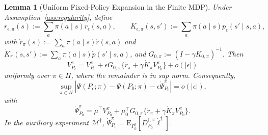 \documentclass[10pt,a4paper]{amsart}
\newtheorem{lemma}{Lemma}
\newcommand{\E}{\mathrm{E}}
\begin{document}
\begin{lemma}[Uniform Fixed-Policy Expansion in the Finite MDP]
\label{lem:finite_mdp_uniform_expansion}
    Under Assumption~\ref{ass:regularity}, define
    \[
        r_{\epsilon,\pi}(s)
        :=\sum_a\pi(a\mid s)r_\epsilon(s,a),
        \qquad
        K_{\epsilon,\pi}(s,s')
        :=\sum_a\pi(a\mid s)p_\epsilon(s'\mid s,a),
    \]
    with
    $\dot r_\pi(s):=\sum_a\pi(a\mid s)\dot r(s,a)$ and
    $\dot K_\pi(s,s')
      :=\sum_a\pi(a\mid s)\dot p(s'\mid s,a)$,
    and $G_{0,\pi}:=(I-\gamma K_{0,\pi})^{-1}$.  Then
    \[
        V_{P_\epsilon}^{\pi}
        =V_{P_0}^{\pi}
        +\epsilon G_{0,\pi}
        \{\dot r_\pi+\gamma\dot K_\pi V_{P_0}^{\pi}\}
        +o(|\epsilon|)
    \]
    uniformly over $\pi\in\Pi$, where the remainder is in sup norm.
    Consequently,
    \begin{equation}\label{eq:finite_mdp_uniform_expansion}
        \sup_{\pi\in\Pi}
        \left|
        \Psi(P_\epsilon;\pi)-\Psi(P_0;\pi)
        -\epsilon\dot\Psi_{P_0}^{\pi}
        \right|
        =o(|\epsilon|),
    \end{equation}
    with
    \[
        \dot\Psi_{P_0}^{\pi}
        =
        \dot\mu^\top V_{P_0}^{\pi}
        +
        \mu_0^\top G_{0,\pi}
        \{\dot r_\pi+\gamma\dot K_\pi V_{P_0}^{\pi}\}.
    \]
    In the auxiliary experiment $\mathcal M^\dagger$,
    $\dot\Psi_{P_0}^{\pi}
      =\E_{P_0^\dagger}
      [D_{P_0}^{\dagger,\pi}\dot\ell^\dagger]$.
\end{lemma}
\end{document}

